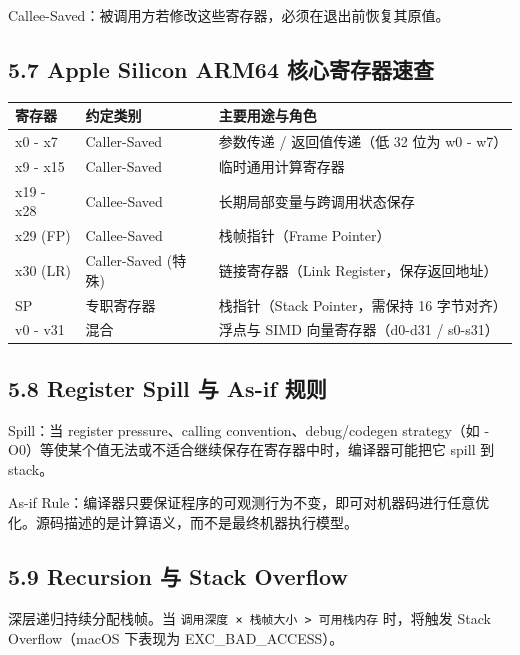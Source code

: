 \documentclass[11pt,a4paper]{article}
\begin{document}
Callee-Saved：被调用方若修改这些寄存器，必须在退出前恢复其原值。

\subsection{5.7 Apple Silicon ARM64 核心寄存器速查}
\begin{table}[htbp]
	\centering
	\small
	\begin{tabularx}{\textwidth}{| X | X | X |}
		\hline
		\rowcolor{codebg}
		\textbf{寄存器}                  & \textbf{约定类别}     & \textbf{主要用途与角色}                \\ \hline
		x0 - x7                       & Caller-Saved      & 参数传递 / 返回值传递（低 32 位为 w0 - w7）   \\ \hline
		\rowcolor{codebg!50} x9 - x15 & Caller-Saved      & 临时通用计算寄存器                       \\ \hline
		x19 - x28                     & Callee-Saved      & 长期局部变量与跨调用状态保存                  \\ \hline
		\rowcolor{codebg!50} x29 (FP) & Callee-Saved      & 栈帧指针（Frame Pointer）             \\ \hline
		x30 (LR)                      & Caller-Saved (特殊) & 链接寄存器（Link Register，保存返回地址）     \\ \hline
		\rowcolor{codebg!50} SP       & 专职寄存器             & 栈指针（Stack Pointer，需保持 16 字节对齐）  \\ \hline
		v0 - v31                      & 混合                & 浮点与 SIMD 向量寄存器（d0-d31 / s0-s31） \\ \hline
	\end{tabularx}
\end{table}
\subsection{5.8 Register Spill 与 As-if 规则}
Spill：当 register pressure、calling convention、debug/codegen strategy（如 -O0）等使某个值无法或不适合继续保存在寄存器中时，编译器可能把它 spill 到 stack。

As-if Rule：编译器只要保证程序的可观测行为不变，即可对机器码进行任意优化。源码描述的是计算语义，而不是最终机器执行模型。

\subsection{5.9 Recursion 与 Stack Overflow}
深层递归持续分配栈帧。当 \texttt{调用深度 × 栈帧大小 > 可用栈内存} 时，将触发 Stack Overflow（macOS 下表现为 EXC\_BAD\_ACCESS）。
\end{document}
